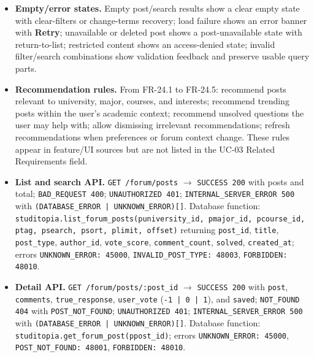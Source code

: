 \documentclass[12pt]{article}
\begin{document}
\begin{itemize}
\item \textbf{Empty/error states.} Empty post/search results show a clear empty state with clear-filters or change-terms recovery; load failure shows an error banner with \textbf{Retry}; unavailable or deleted post shows a post-unavailable state with return-to-list; restricted content shows an access-denied state; invalid filter/search combinations show validation feedback and preserve usable query parts.
\item \textbf{Recommendation rules.} From FR-24.1 to FR-24.5: recommend posts relevant to university, major, courses, and interests; recommend trending posts within the user's academic context; recommend unsolved questions the user may help with; allow dismissing irrelevant recommendations; refresh recommendations when preferences or forum context change. These rules appear in feature/UI sources but are not listed in the UC-03 Related Requirements field.
\item \textbf{List and search API.} \texttt{GET /forum/posts} $\rightarrow$ \texttt{SUCCESS 200} with posts and total; \texttt{BAD\_REQUEST 400}; \texttt{UNAUTHORIZED 401}; \texttt{INTERNAL\_SERVER\_ERROR 500} with \texttt{(DATABASE\_ERROR | UNKNOWN\_ERROR)[]}. Database function: \texttt{studitopia.list\_forum\_posts(puniversity\_id, pmajor\_id, pcourse\_id, ptag, psearch, psort, plimit, offset)} returning \texttt{post\_id}, \texttt{title}, \texttt{post\_type}, \texttt{author\_id}, \texttt{vote\_score}, \texttt{comment\_count}, \texttt{solved}, \texttt{created\_at}; errors \texttt{UNKNOWN\_ERROR: 45000}, \texttt{INVALID\_POST\_TYPE: 48003}, \texttt{FORBIDDEN: 48010}.
\item \textbf{Detail API.} \texttt{GET /forum/posts/:post\_id} $\rightarrow$ \texttt{SUCCESS 200} with \texttt{post}, \texttt{comments}, \texttt{true\_response}, \texttt{user\_vote} (\texttt{-1 | 0 | 1}), and \texttt{saved}; \texttt{NOT\_FOUND 404} with \texttt{POST\_NOT\_FOUND}; \texttt{UNAUTHORIZED 401}; \texttt{INTERNAL\_SERVER\_ERROR 500} with \texttt{(DATABASE\_ERROR | UNKNOWN\_ERROR)[]}. Database function: \texttt{studitopia.get\_forum\_post(ppost\_id)}; errors \texttt{UNKNOWN\_ERROR: 45000}, \texttt{POST\_NOT\_FOUND: 48001}, \texttt{FORBIDDEN: 48010}.

\end{itemize}
\end{document}

